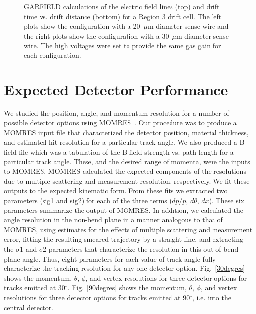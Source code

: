 \begin{figure}[htbp]
\vspace{12.0cm}
\caption{\small{GARFIELD calculations of the electric field lines (top)
and drift time vs. drift distance (bottom) for a Region 3 drift cell.  The 
left plots show the configuration with a 20~$\mu$m diameter sense wire and 
the right plots show the configuration with a 30~$\mu$m diameter sense wire.
The high voltages were set to provide the same gas gain for each
configuration.}}
\label{garfield}
\end{figure}

\section{Expected Detector Performance}

We studied the position, angle, and momentum resolution for a number of 
possible detector options using MOMRES~\cite{momres}.  Our procedure was 
to produce a MOMRES input file that characterized the detector position, 
material thickness, and estimated hit resolution for a particular track 
angle.  We also produced a B-field file which was a tabulation of the 
B-field strength vs. path length for a particular track angle.  These, 
and the desired range of momenta, were the inputs to MOMRES. MOMRES 
calculated the expected components of the resolutions due to multiple 
scattering and measurement resolution, respectively.  We fit these outputs 
to the expected kinematic form. From these fits we extracted two parameters 
(sig1 and sig2) for each of the three terms ($dp/p$, $d\theta$, $dx$). 
These six parameters summarize the output of MOMRES. In addition, we 
calculated the angle resolution in the non-bend plane in a manner 
analogous to that of MOMRES, using estimates for the effects of multiple 
scattering and measurement error, fitting the resulting smeared trajectory 
by a straight line, and extracting the $\sigma$1 and $\sigma$2 parameters 
that characterize the resolution in this out-of-bend-plane angle.  Thus, 
eight parameters for each value of track angle fully characterize the 
tracking resolution for any one detector option.  Fig.~\ref{30degres} 
shows the momentum, $\theta$, $\phi$, and vertex resolutions for three 
detector options for tracks emitted at 30$^{\circ}$.  Fig.~\ref{90degres} 
shows the momentum, $\theta$, $\phi$, and vertex resolutions for three 
detector options for tracks emitted at 90$^{\circ}$, i.e. into the central 
detector. 

